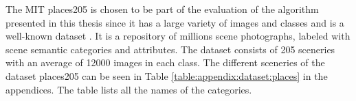 The MIT places205 is chosen to be part of the evaluation of the algorithm presented in this thesis since it has a large variety of images and classes and is a well-known dataset \cite{zhou2016places}. It is a repository of millions scene photographs, labeled with scene semantic categories and attributes. The dataset consists of 205 sceneries with an average of 12000 images in each class. 
The different sceneries of the dataset places205 can be seen in Table \ref{table:appendix:dataset:places} in the appendices. The table lists all the names of the categories. 

